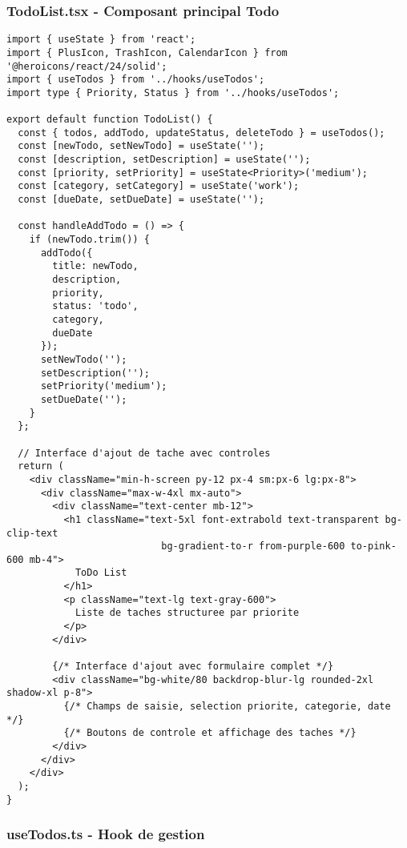 \documentclass[12pt,a4paper]{article}
\begin{document}
\subsubsection{TodoList.tsx - Composant principal Todo}

\begin{lstlisting}[caption=TodoList.tsx - Gestion des taches (Andre)]
import { useState } from 'react';
import { PlusIcon, TrashIcon, CalendarIcon } from '@heroicons/react/24/solid';
import { useTodos } from '../hooks/useTodos';
import type { Priority, Status } from '../hooks/useTodos';

export default function TodoList() {
  const { todos, addTodo, updateStatus, deleteTodo } = useTodos();
  const [newTodo, setNewTodo] = useState('');
  const [description, setDescription] = useState('');
  const [priority, setPriority] = useState<Priority>('medium');
  const [category, setCategory] = useState('work');
  const [dueDate, setDueDate] = useState('');

  const handleAddTodo = () => {
    if (newTodo.trim()) {
      addTodo({
        title: newTodo,
        description,
        priority,
        status: 'todo',
        category,
        dueDate
      });
      setNewTodo('');
      setDescription('');
      setPriority('medium');
      setDueDate('');
    }
  };

  // Interface d'ajout de tache avec controles
  return (
    <div className="min-h-screen py-12 px-4 sm:px-6 lg:px-8">
      <div className="max-w-4xl mx-auto">
        <div className="text-center mb-12">
          <h1 className="text-5xl font-extrabold text-transparent bg-clip-text 
                           bg-gradient-to-r from-purple-600 to-pink-600 mb-4">
            ToDo List
          </h1>
          <p className="text-lg text-gray-600">
            Liste de taches structuree par priorite
          </p>
        </div>
        
        {/* Interface d'ajout avec formulaire complet */}
        <div className="bg-white/80 backdrop-blur-lg rounded-2xl shadow-xl p-8">
          {/* Champs de saisie, selection priorite, categorie, date */}
          {/* Boutons de controle et affichage des taches */}
        </div>
      </div>
    </div>
  );
}
\end{lstlisting}

\subsubsection{useTodos.ts - Hook de gestion}
\end{document}
